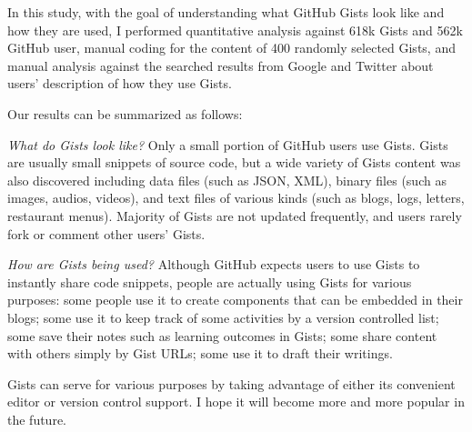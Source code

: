 In this study, with the goal of understanding what GitHub Gists look like and how they are used, I performed quantitative analysis against 618k Gists and 562k GitHub user, manual coding for the content of 400 randomly selected Gists, and manual analysis against the searched results from Google and Twitter about users' description of how they use Gists. 

Our results can be summarized as follows:

\textsl{What do Gists look like?} Only a small portion of GitHub users use Gists. Gists are usually small snippets of source code, but a wide variety of Gists content was also discovered including data files (such as JSON, XML), binary files (such as images, audios, videos), and text files of various kinds (such as blogs, logs, letters, restaurant menus). Majority of Gists are not updated frequently, and users rarely fork or comment other users' Gists.

\textsl{How are Gists being used?} Although GitHub expects users to use Gists to instantly share code snippets, people are actually using Gists for various purposes: some people use it to create components that can be embedded in their blogs; some use it to keep track of some activities by a version controlled list; some save their notes such as learning outcomes in Gists; some share content with others simply by Gist URLs; some use it to draft their writings.

Gists can serve for various purposes by taking advantage of either its convenient editor or version control support. I hope it will become more and more popular in the future.